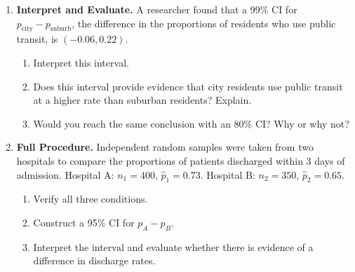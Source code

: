 \documentclass[10pt]{article}
\begin{document}
\namedateperiod

\vspace{0.15in}

\begin{enumerate}

\item \textbf{Interpret and Evaluate.} A researcher found that a 99\% CI for
$p_{\text{city}} - p_{\text{suburb}}$, the difference in the proportions of residents
who use public transit, is $(-0.06, 0.22)$.

\begin{enumerate}[label=\alph*.]
  \item Interpret this interval. 
  \item Does this interval provide evidence that city residents use public transit at a
        higher rate than suburban residents? Explain. 
  \item Would you reach the same conclusion with an 80\% CI? Why or why not?
\end{enumerate}

\item \textbf{Full Procedure.} Independent random samples were taken from two
hospitals to compare the proportions of patients discharged within 3 days of admission.
Hospital A: $n_1=400$, $\hat p_1 = 0.73$. Hospital B: $n_2=350$, $\hat p_2 = 0.65$.

\begin{enumerate}[label=\alph*.]
  \item Verify all three conditions. 
  \item Construct a 95\% CI for $p_A - p_B$. 
  \item Interpret the interval and evaluate whether there is evidence of a difference
        in discharge rates. 
\end{enumerate}

\end{enumerate}
\end{document}
